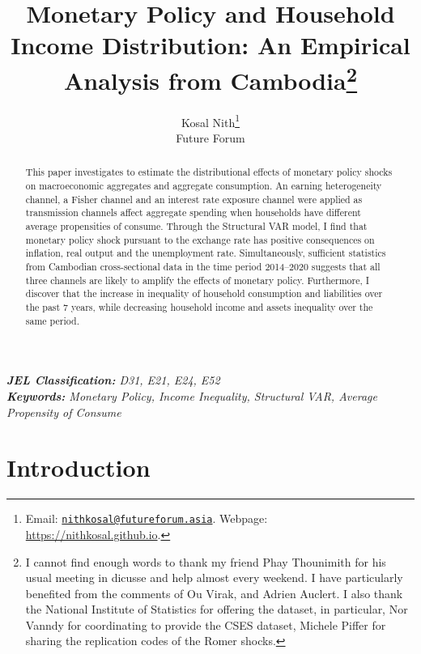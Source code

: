 \documentclass[11pt,letterpaper]{article}
\author{Kosal Nith\footnote{Email: \href{mailto:nithkosal@futureforum.asia}{\texttt{nithkosal@futureforum.asia}}. Webpage: \url{https://nithkosal.github.io}.} \\
	\small{Future Forum}  
}
\title{\textbf{Monetary Policy and Household Income Distribution: An Empirical Analysis from Cambodia\footnote{I cannot find enough words to thank my friend Phay Thounimith for his usual meeting in dicusse and help almost every weekend. I have particularly benefited from the comments of Ou Virak, and Adrien Auclert. I also thank the National Institute of Statistics for offering the dataset, in particular, Nor Vanndy for coordinating to provide the CSES dataset, Michele Piffer for sharing the replication codes of the Romer shocks.}}}
\begin{document}
	

	 
\maketitle
	\begin{abstract}
	This paper investigates to estimate the distributional effects of monetary policy shocks on macroeconomic aggregates and aggregate consumption. An earning heterogeneity channel, a Fisher channel and an interest rate exposure channel were applied as transmission channels affect aggregate spending when households have different average propensities of consume. Through the Structural VAR model, I find that monetary policy shock pursuant to the exchange rate has positive consequences on inflation, real output and the unemployment rate. Simultaneously, sufficient statistics from Cambodian cross-sectional data in the time period 2014--2020 suggests that all three channels are likely to amplify the effects of monetary policy. Furthermore, I discover that the increase in inequality of household consumption and liabilities over the past 7 years, while decreasing household income and assets inequality over the same period. 

	\end{abstract}
	\textit{\textbf{JEL Classification:} D31, E21, E24, E52} \\
	\textit{\textbf{Keywords:} Monetary Policy, Income Inequality, Structural VAR, Average Propensity of Consume}
	
	\clearpage

\section{Introduction}\label{sec:intro}
\end{document}
